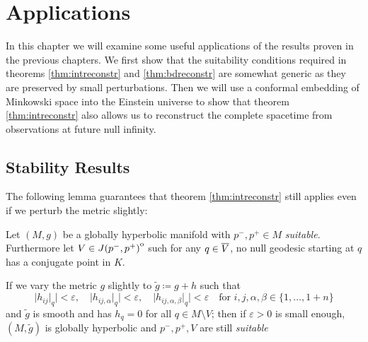 \chapter{Applications}\label{chap:applications}
In this chapter we will examine some useful applications of the results proven in the previous chapters. We first show that the suitability conditions required in theorems \ref{thm:intreconstr} and \ref{thm:bdreconstr} are somewhat generic as they are preserved by small perturbations. Then we will use a conformal embedding of Minkowski space into the Einstein universe to show that theorem \ref{thm:intreconstr} also allows us to reconstruct the complete spacetime from observations at future null infinity.

\section{Stability Results}
The following lemma guarantees that theorem \ref{thm:intreconstr} still applies even if we perturb the metric slightly:
\begin{lemma}
    Let $(M,g)$ be a globally hyperbolic manifold with $p^-,p^+\in M$ \emph{suitable}. Furthermore let $V\in {\kern0ptJ(p^-,p^+)}^{\mathrm{o}}$ such for any $q\in {\overline{V}}$, no null geodesic starting at $q$ has a conjugate point in $K$.

    If we vary the metric $g$ slightly to $\widetilde{g}\coloneqq g+h$ such that 
    \[
        \lvert h_{ij}\rvert_q \rvert <\varepsilon, \quad \lvert h_{ij,\alpha}\rvert_q \rvert <\varepsilon, \quad \lvert h_{ij,\alpha,\beta}\rvert_q \rvert <\varepsilon \quad \text{for }i,j,\alpha,\beta\in \{1,\dots, 1+n\}
    \]
    and $\widetilde{g}$ is smooth and has $h_q=0$ for all $q\in M\setminus V$; then if $\varepsilon>0$ is small enough, $(M,\widetilde{g})$ is globally hyperbolic and $p^-,p^+,V$ are still \emph{suitable}
\end{lemma}
